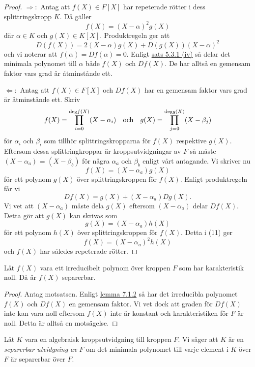 \documentclass{article}
\newcommand{\grad}[0]{\textnormal{deg}}
\theoremstyle{definition}
\begin{document}
\begin{proof}
  $\Rightarrow:$ Antag att $f(X) \in F[X]$ har repeterade rötter i dess splittringskropp $K$. Då gäller 
  \[f(X) = (X-\alpha)^2 g(X)\]
  där $\alpha \in K$ och $g(X) \in K[X].$ Produktregeln ger att 
  \[D(f(X)) = 2(X- \alpha) g(X) + D(g(X)) (X - \alpha)^2\]
  och vi noterar att $f(\alpha) = Df(\alpha) = 0.$ Enligt \hyperlink{minpol}{sats 5.3.1 (iv)} så delar det minimala polynomet till $\alpha$ både 
  $f(X)$ och $Df(X)$. De har alltså en gemensam faktor vars grad är åtminstånde ett. 

  $\Leftarrow:$ Antag att $f(X) \in F[X]$ och $Df(X)$ har en gemensam faktor vars grad är åtminstånde ett. 
  Skriv 
  \[f(X) = \prod_{i = 0}^{\grad f(X)} (X-\alpha_i) \quad \textnormal{och} \quad g(X) = \prod_{j = 0}^{\grad g(X)} (X-\beta_j)\]
  för $\alpha_i$ och $\beta_i$ som tillhör splittringskropparna för $f(X)$ respektive $g(X)$. Eftersom dessa 
  splittringkroppar är kroppsutvidgningar av $F$ så måste $(X - \alpha_a)$ = $(X - \beta_b)$ för några $\alpha_a$ och $\beta_b$ enligt vårt antagande. 
  Vi skriver nu 
  \begin{equation}
    f(X) = (X-\alpha_a)g(X)
  \end{equation}
  för ett polynom $g(X)$ över splittringskroppen för $f(X)$. Enligt produktregeln får vi 
  \[Df(X) = g(X) + (X - \alpha_a)Dg(X).\]
  Vi vet att $(X - \alpha_a)$ måste dela $g(X)$ eftersom $(X - \alpha_a)$ delar $Df(X)$. Detta gör att $g(X)$ kan skrivas som
  \[g(X) = (X - \alpha_a)h(X)\]
  för ett polynom $h(X)$ över splittringskroppen för $f(X)$. Detta i (11) ger 
  \[f(X) = (X - \alpha_a)^2h(X)\]
  och $f(X)$ har således repeterade rötter.
\end{proof}

\hypertarget{irrsep}{}
\begin{myprop}{}{}
  Låt $f(X)$ vara ett irreducibelt polynom över kroppen $F$ som har karakteristik noll. Då är $f(X)$ separerbar. 
\end{myprop}

\begin{proof}
  Antag motsatsen. Enligt \hyperlink{lemma7.1.2}{lemma 7.1.2} så har det irreducibla polynomet $f(X)$ och $Df(X)$ en gemensam faktor. 
  Vi vet dock att graden för $Df(X)$ inte kan vara noll eftersom $f(X)$ inte är konstant och karakteristiken för $F$ är noll. Detta är alltså 
  en motsägelse.
\end{proof}

\begin{mydef}{}{}
  Låt $K$ vara en algebraisk kroppsutvidgning till kroppen $F$. Vi säger att $K$ är en \textit{separerbar utvidgning av} $F$ om 
  det minimala polynomet till varje element i $K$ över $F$ är separerbar över $F$. 
\end{mydef}
\end{document}
